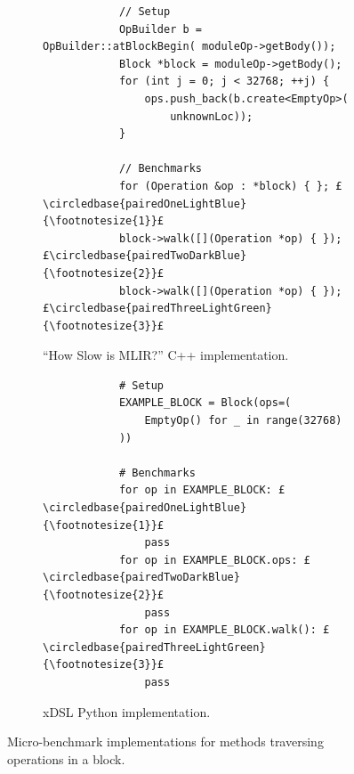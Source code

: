 \begin{figure}[H]
    \centering
    \begin{subfigure}[b]{0.45\textwidth}
       \centering
        \begin{verbatim}
            // Setup
            OpBuilder b = OpBuilder::atBlockBegin( moduleOp->getBody());
            Block *block = moduleOp->getBody();
            for (int j = 0; j < 32768; ++j) {
                ops.push_back(b.create<EmptyOp>(
                    unknownLoc));
            }

            // Benchmarks
            for (Operation &op : *block) { }; £\circledbase{pairedOneLightBlue}{\footnotesize{1}}£
            block->walk([](Operation *op) { }); £\circledbase{pairedTwoDarkBlue}{\footnotesize{2}}£
            block->walk([](Operation *op) { }); £\circledbase{pairedThreeLightGreen}{\footnotesize{3}}£
        \end{verbatim}
        \caption{``How Slow is MLIR?'' C++ implementation.}
        \label{listing:ubenchmark-op-traversal-bench-mlir}
    \end{subfigure}
    \hfill
    \begin{subfigure}[b]{0.45\textwidth}
        \centering
        \begin{verbatim}
            # Setup
            EXAMPLE_BLOCK = Block(ops=(
                EmptyOp() for _ in range(32768)
            ))

            # Benchmarks
            for op in EXAMPLE_BLOCK: £\circledbase{pairedOneLightBlue}{\footnotesize{1}}£
                pass
            for op in EXAMPLE_BLOCK.ops: £\circledbase{pairedTwoDarkBlue}{\footnotesize{2}}£
                pass
            for op in EXAMPLE_BLOCK.walk(): £\circledbase{pairedThreeLightGreen}{\footnotesize{3}}£
                pass
        \end{verbatim}
        \footnotesize\vspace{1em}
        \caption{xDSL Python implementation.}
        \label{listing:ubenchmark-op-traversal-bench-xdsl}
    \end{subfigure}
    \vspace{1em}
    \captionsetup{name=Listing}
    \caption{Micro-benchmark implementations for methods traversing operations in a block.}
    \label{listing:ubenchmark-op-traversal-bench}
\end{figure}


